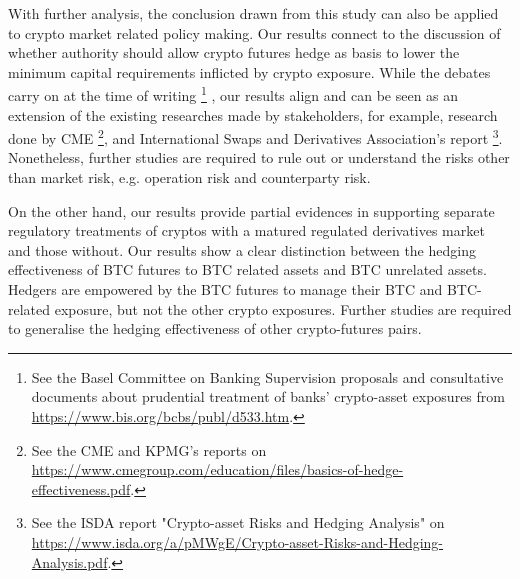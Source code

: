 \documentclass[11pt,a4paper,english]{article}
\begin{document}
With further analysis, the conclusion drawn from this study can also be applied to crypto market related policy making.
Our results connect to the discussion of whether authority should allow crypto futures hedge as basis to lower the minimum capital requirements inflicted by crypto exposure.
While the debates carry on at the time of writing
\footnote{See the Basel Committee on Banking Supervision proposals and consultative documents about prudential treatment of banks' crypto-asset exposures from \url{https://www.bis.org/bcbs/publ/d533.htm}.}
, our results align and can be seen as an extension of the existing researches made by stakeholders,
for example, research done by CME \footnote{See the CME and KPMG's reports on \url{https://www.cmegroup.com/education/files/basics-of-hedge-effectiveness.pdf}.},
and International Swaps and Derivatives Association's report \footnote{See the ISDA report "Crypto-asset Risks and Hedging Analysis" on \url{https://www.isda.org/a/pMWgE/Crypto-asset-Risks-and-Hedging-Analysis.pdf}.}.
Nonetheless, further studies are required to rule out or understand the risks other than market risk, e.g. operation risk and counterparty risk. 

On the other hand, our results provide partial evidences in supporting separate regulatory treatments of cryptos with a matured regulated derivatives market and those without. 
Our results show a clear distinction between the hedging effectiveness of BTC futures to BTC related assets and BTC unrelated assets. 
Hedgers are empowered by the BTC futures to manage their BTC and BTC-related exposure, but not the other crypto exposures.
Further studies are required to generalise the hedging effectiveness of other crypto-futures pairs. 







\end{document}
